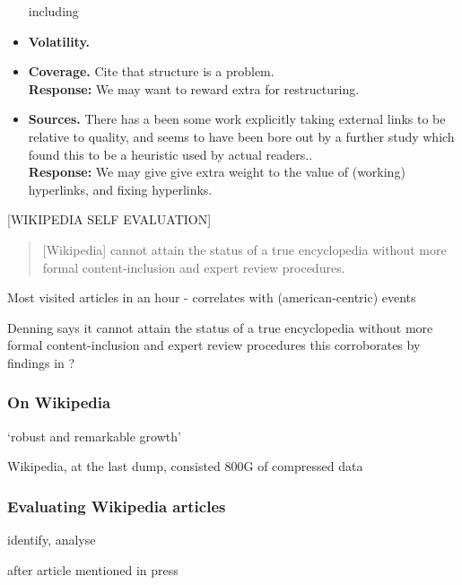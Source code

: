 \documentclass[a4paper,11pt,twoside,notitlepage]{article}
\begin{document}
\begin{itemize}
            including 
          \item \textbf{Volatility.} 
          \item \textbf{Coverage.} Cite that structure is a
            problem.\\
            \textbf{Response:} We may want to reward extra for restructuring.
          \item \textbf{Sources.} There has a been some work
            explicitly taking external links to be relative to
            quality,\cite{CITEHYPERLINKS} and seems to have been bore
            out by a further study which found this to be a heuristic
            used by actual readers.\cite{THISHEURISTICIGUESS}.\\
            \textbf{Response:} We may give give extra weight to the value
            of (working) hyperlinks, and fixing hyperlinks.
        \end{itemize}
            
        [WIKIPEDIA SELF EVALUATION]
        \begin{quote}
          [Wikipedia] cannot attain the status of a true encyclopedia
          without more formal content-inclusion and expert review
          procedures.\cite{Denning2005}
        \end{quote}

        Most visited articles in an hour - correlates with
        (american-centric) events \cite{wiki-visits}

        Denning says it cannot attain the status of a true
        encyclopedia without more formal content-inclusion and expert
        review procedures\cite{Denning2005} this corroborates by
        findings in \cite{Giles2005}?

        \subsubsection{On Wikipedia}
        `robust and remarkable growth'
        \cite{Kittur2007}\cite{Voss2005} 
        
        Wikipedia, at the last dump, consisted 800G of compressed data
        \cite{wiki-dump}

        \subsubsection{Evaluating Wikipedia articles}
        identify, analyse

        after article mentioned in press \cite{Lih2004}
\end{document}
